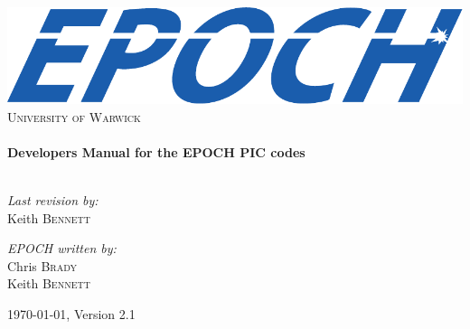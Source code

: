 \begin{titlepage}

\begin{center}

\includegraphics[width=14cm]{./images/EPOCHLogo}\\[1cm]

\textsc{\LARGE{University of Warwick}}\\[1.5cm]

\HRule\\[0.2cm]%
{\huge\bfseries{Developers Manual for the EPOCH PIC codes}}\\[0.4cm]
\HRule\\[1.5cm]

\begin{minipage}{0.4\textwidth}
\begin{flushleft}\large%
\emph{Last revision by:}\\
Keith \textsc{Bennett}
\end{flushleft}
\end{minipage}
\begin{minipage}{0.4\textwidth}
\begin{flushright}\large%
\emph{EPOCH written by:} \\
Chris \textsc{Brady}\\
Keith \textsc{Bennett}\\
\end{flushright}
\end{minipage}

\vfill%
{\large\today, {\EPOCH} Version 2.1}

\end{center}

\end{titlepage}
